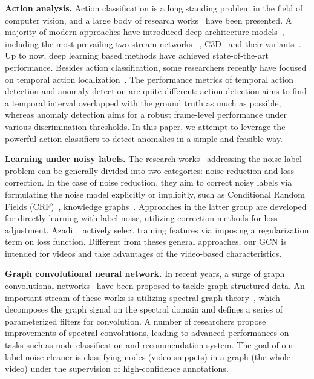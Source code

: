 \documentclass[10pt,twocolumn,letterpaper]{article}
\begin{document}
\textbf{Action analysis.} Action classification is a long standing problem in the field of computer vision, and a large body of research works~\cite{wang2013action,tran2015learning,tsn_wang,carreira2017quo,karpathy2014large,Wang_2018_ECCV} have been presented. A majority of modern approaches have introduced deep architecture models~\cite{carreira2017quo,tran2015learning,simonyan2014two,tsn_wang}, including the most prevailing two-stream networks ~\cite{simonyan2014two}, C3D~\cite{tran2015learning} and their variants~\cite{tsn_wang,feichtenhofer2016convolutional,qiu2017learning,carreira2017quo}. Up to now, deep learning based methods have achieved state-of-the-art performance. Besides action classification, some researchers recently have focused on temporal action localization~\cite{zhao2017ssn,Lin:2017:SST:3123266.3123343,zjx_mm2018,zheng_eccv18_autoloc,gao2017cascaded}. The performance metrics of temporal action detection and anomaly detection are quite different: action detection aims to find a temporal interval overlapped with the ground truth as much as possible, whereas anomaly detection aims for a robust frame-level performance under various discrimination thresholds. In this paper, we attempt to leverage the powerful action classifiers to detect anomalies in a simple and feasible way.

\textbf{Learning under noisy labels.} The research works~\cite{larsen1998design,natarajan2013learning,patrini2017making,goldberger2017training} addressing the noise label problem can be generally divided into two categories: noise reduction and loss correction. In the case of noise reduction, they aim to correct noisy labels via formulating the noise model explicitly or implicitly, such as Conditional Random Fields (CRF)~\cite{vahdat2017toward}, knowledge graphs~\cite{li2017learning}. Approaches in the latter group are developed for directly learning with label noise, utilizing correction methods for loss adjustment. Azadi \etal~\cite{azadi2016auxiliary} actively select training features via imposing a regularization term on loss function. Different from theses general approaches, our GCN is intended for videos and take advantages of the video-based characteristics.

\textbf{Graph convolutional neural network.} In recent years, a surge of graph convolutional networks~\cite{ou2016asymmetric,Kipf2016Semi,Pfeiffer:2014:AGM:2566486.2567993,li2015gated,grover2016node} have been proposed to tackle graph-structured data. An important stream of these works is utilizing spectral graph theory~\cite{bruna2014spetral,defferrard2016convolutional}, which decomposes the graph signal on the spectral domain and defines a series of parameterized filters for convolution. A number of researchers propose improvements of spectral convolutions, leading to advanced performances on tasks such as node classification and recommendation system. The goal of our label noise cleaner is classifying nodes (video snippets) in a graph (the whole video) under the supervision of high-confidence annotations.
\end{document}
